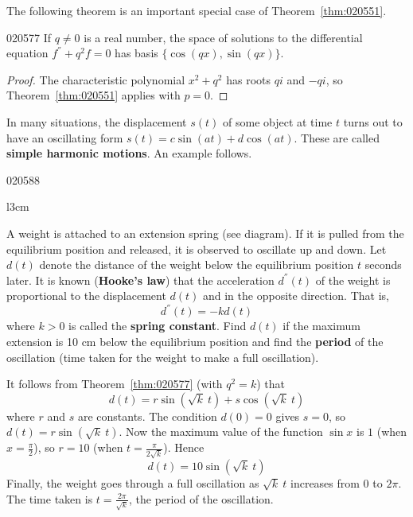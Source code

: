 The following theorem is an important special case of Theorem~\ref{thm:020551}.

\begin{theorem}{}{020577}
If $q \neq 0$ is a real number, the space of solutions to the differential equation $f^\dprime + q^2f = 0$ has basis $\{\cos(qx), \sin(qx)\}$.
\end{theorem}

\begin{proof}
The characteristic polynomial $x^{2} + q^{2}$ has roots $qi$ and $-qi$, so Theorem~\ref{thm:020551} applies with $p = 0$.
\end{proof}

In many situations, the displacement $s(t)$ of some object at time $t$ turns out to have an oscillating form $s(t) = c \sin(at) + d \cos(at)$. These are called \textbf{simple harmonic motions}. An example follows.

\begin{example}{}{020588}
\begin{wrapfigure}[11]{l}{3cm}
	\centering
	
\end{wrapfigure}

\setlength{\rightskip}{0pt plus 200pt}
A weight is attached to an extension spring (see diagram). If it is pulled from the equilibrium position and released, it is observed to oscillate up and down. Let $d(t)$ denote the distance of the weight below the equilibrium position $t$ seconds later. It is known (\textbf{Hooke's law}) that the acceleration $d^\dprime(t)$ of the weight is proportional to the displacement $d(t)$ and in the opposite direction. That is,
\begin{equation*}
d^\dprime(t) = -kd(t)
\end{equation*}
where $k > 0$ is called the \textbf{spring constant}. Find $d(t)$ if the maximum extension is 10 cm below the equilibrium position and find the \textbf{period} of the oscillation (time taken for the weight to make a full oscillation).

\begin{solution}
It follows from Theorem~\ref{thm:020577} (with $q^{2} = k$) that
\begin{equation*}
d(t) = r \sin (\sqrt{k}\ t) + s \cos(\sqrt{k}\ t)
\end{equation*}
where $r$ and $s$ are constants. The condition $d(0) = 0$ gives $s = 0$, so $d(t) = r \sin (\sqrt{k}\ t)$. Now the maximum value of the function $\sin x$ is $1$ (when $x = \frac{\pi}{2}$), so $r = 10$ (when $t = \frac{\pi}{2\sqrt{k}}$). Hence
\begin{equation*}
d(t) = 10 \sin (\sqrt{k}\ t) 
\end{equation*}
Finally, the weight goes through a full oscillation as $\sqrt{k}\ t$ increases from $0$ to $2 \pi$. The time taken is $t = \frac{2 \pi}{\sqrt{k}}$, the period of the oscillation.
\end{solution}
\end{example}

